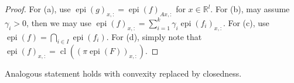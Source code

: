 \begin{proof}
	For (a), use $\operatorname{epi}(g)_{x,:}=\operatorname{epi}(f)_{Ax,:}$ for $x\in \mathbb{R}^l$. For (b), may assume $ \gamma_i>0$, then we may use $\operatorname{epi}(f)_{x,:}=\sum_{i=1}^k\gamma_i\operatorname{epi}(f_i)_{x,:}$.	For (c), use $\operatorname{epi}(f)=\bigcap_{i\in I}\operatorname{epi}(f_i)$. For (d), simply note that $\operatorname{epi}(f)_{x,:}=\operatorname{cl}((\pi\operatorname{epi}(F))_{x,:})$.
\end{proof}

\begin{rmrk}
	Analogous statement holds with convexity replaced by closedness.
\end{rmrk}

